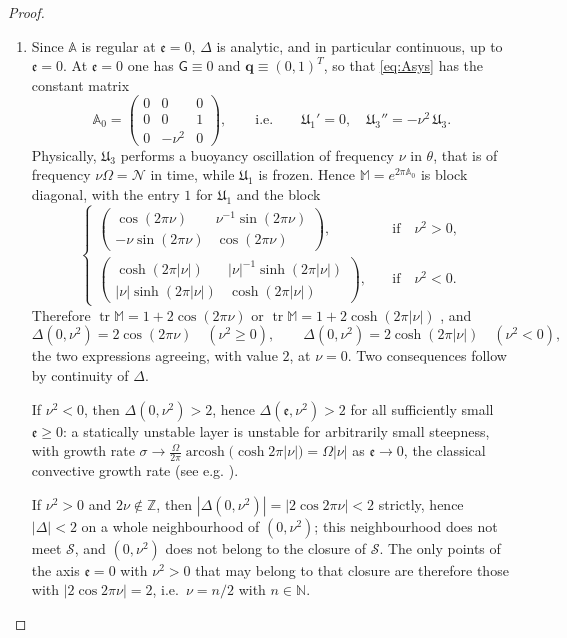 \documentclass[reqno]{amsart}
\newcommand{\Msf}{\mathsf{G}}
\newcommand{\ee}{\mathfrak{e}}
\newcommand{\tr}{\operatorname{tr}}     %
\newcommand{\arcosh}{\operatorname{arcosh}} %
\begin{document}
\begin{proof}
\begin{enumerate}
\begin{itemize}
\end{itemize}
\item[(iii)]
Since $\mathbb A$ is regular at $\ee=0$, $\Delta$ is analytic, and in particular continuous, up to $\ee=0$. At $\ee=0$ one has $\Msf\equiv0$ and $\mathbf q\equiv(0,1)^T$, so that \eqref{eq:Asys} has the constant matrix
\[
\mathbb A_0=\begin{pmatrix}0&0&0\\0&0&1\\0&-\nu^2&0\end{pmatrix},
\qquad\text{i.e.}\qquad
\mathfrak{U}_1'=0,\quad \mathfrak{U}_3''=-\nu^2\,\mathfrak{U}_3 .
\]
Physically, $\mathfrak{U}_3$ performs a buoyancy oscillation of frequency $\nu$ in $\theta$, that is of frequency $\nu\Omega=\mathcal N$ in time, while $\mathfrak{U}_1$ is frozen. Hence $\mathbb M=e^{2\pi\mathbb A_0}$ is block diagonal, with the entry $1$ for $\mathfrak{U}_1$ and the block
\[
\begin{cases}
\begin{pmatrix}
\cos (2\pi\nu) & \nu^{-1}\sin (2\pi\nu)\\
-\nu\sin (2\pi\nu) & \cos (2\pi\nu)
\end{pmatrix},
& \quad\text{if}\quad\nu^2>0,  \\[1.2em]
\begin{pmatrix}
\cosh (2\pi|\nu|) & |\nu|^{-1}\sinh (2\pi|\nu|)\\
|\nu|\sinh (2\pi|\nu|) & \cosh (2\pi|\nu|)
\end{pmatrix},
& \quad\text{if}\quad \nu^2<0.
\end{cases}
\]
 Therefore $\tr\mathbb M=1+2\cos(2\pi\nu)$ or $\tr\mathbb M=1+2\cosh(2\pi|\nu|)$ , and
\[
\Delta(0,\nu^2)=2\cos(2\pi\nu)\quad(\nu^2\ge0),\qquad \Delta(0,\nu^2)=2\cosh(2\pi|\nu|)\quad(\nu^2<0),
\]
the two expressions agreeing, with value $2$, at $\nu=0$. Two consequences follow by continuity of $\Delta$.

If $\nu^2<0$, then $\Delta(0,\nu^2)>2$, hence $\Delta(\ee,\nu^2)>2$ for all sufficiently small $\ee\geq0$: a statically unstable layer is unstable for arbitrarily small steepness, with growth rate $\sigma\to\frac{\Omega}{2\pi}\arcosh\big(\cosh2\pi|\nu|\big)=\Omega|\nu|$ as $\ee\to0$, the classical convective growth rate (see e.g. \cite{Chandrasekhar,Vallis}).

If $\nu^2>0$ and $2\nu\notin\mathbb Z$, then $|\Delta(0,\nu^2)|=|2\cos2\pi\nu|<2$ strictly, hence $|\Delta|<2$ on a whole neighbourhood of $(0,\nu^2)$; this neighbourhood does not meet $\mathcal S$, and $(0,\nu^2)$ does not belong to the closure of $\mathcal S$. The only points of the axis $\ee=0$ with $\nu^2>0$ that may belong to that closure are therefore those with $|2\cos2\pi\nu|=2$, i.e.\ $\nu=n/2$ with $n\in\mathbb N$.
\end{enumerate}
\end{proof}
\end{document}
